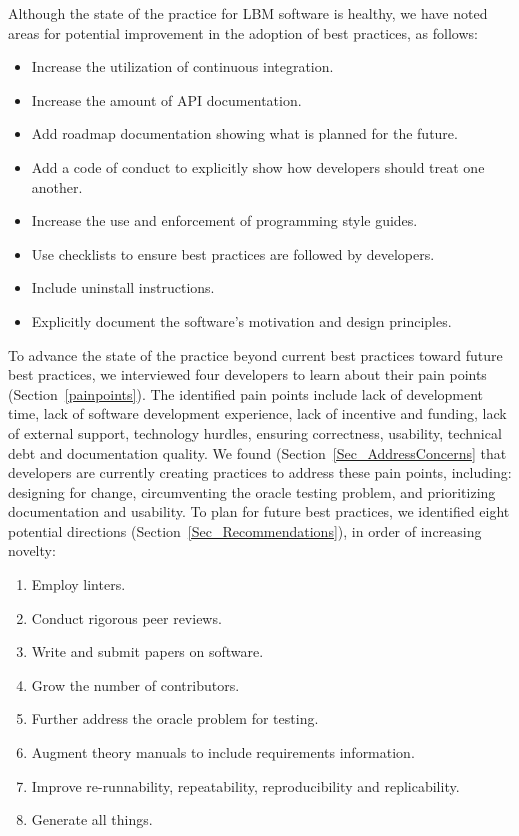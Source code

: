 \documentclass[final, 3p, times, authoryear]{elsarticle}
\begin{document}
Although the state of the practice for LBM software is healthy, we have noted
areas for potential improvement in the adoption of best practices, as follows:

\begin{itemize}
	\item Increase the utilization of continuous integration.
	\item Increase the amount of API documentation.
	\item Add roadmap documentation showing what is planned for the future.
	\item Add a code of conduct to explicitly show how developers should treat
	one another.
	\item Increase the use and enforcement of programming style guides.
	\item Use checklists to ensure best practices are followed by developers.
	\item Include uninstall instructions.
	\item Explicitly document the software's motivation and design principles.
\end{itemize}

To advance the state of the practice beyond current best practices toward future
best practices, we interviewed four developers to learn about their pain points
(Section~\ref{painpoints}).  The identified pain points include lack of
development time, lack of software development experience, lack of incentive and
funding, lack of external support, technology hurdles, ensuring correctness,
usability, technical debt and documentation quality.  We found
(Section~\ref{Sec_AddressConcerns} that developers are currently creating
practices to address these pain points, including: designing for change,
circumventing the oracle testing problem, and prioritizing documentation and
usability.  To plan for future best practices, we identified eight
potential directions (Section~\ref{Sec_Recommendations}), in order of increasing
novelty:

\begin{enumerate}
	\item Employ linters.
	\item Conduct rigorous peer reviews.
	\item Write and submit papers on software.
	\item Grow the number of contributors.
	\item Further address the oracle problem for testing.
	\item Augment theory manuals to include requirements information.
	\item Improve re-runnability, repeatability, reproducibility and
	replicability.
	\item Generate all things.
\end{enumerate}
\end{document}
